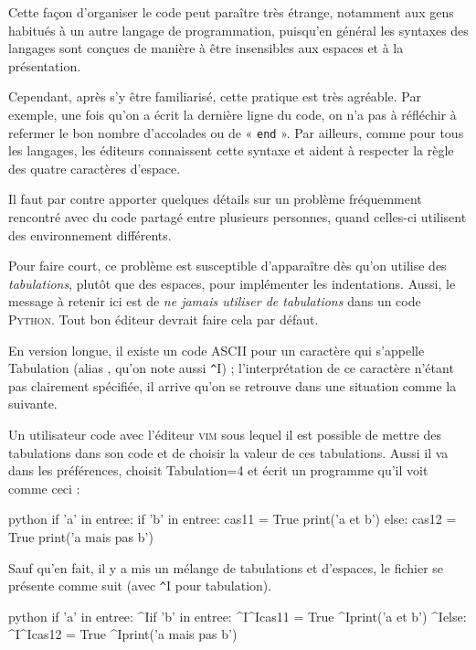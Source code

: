 Cette façon d'organiser le code peut paraître très étrange, notamment aux gens habitués à un autre langage de programmation, puisqu'en général les syntaxes des langages sont conçues de manière à être insensibles aux espaces et à la présentation.

Cependant, après s'y être familiarisé, cette pratique est très agréable. Par exemple, une fois qu'on a écrit la dernière ligne du code, on n'a pas à réfléchir à refermer le bon nombre d'accolades ou de « \texttt{end} ».
Par ailleurs, comme pour tous les langages, les éditeurs connaissent cette syntaxe et aident à respecter la règle des quatre caractères d'espace.

Il faut par contre apporter quelques détails sur un problème fréquemment rencontré avec du code partagé entre plusieurs personnes, quand celles-ci utilisent des environnement différents.

\begin{linewidthnote}
Pour faire court, ce problème est susceptible d'apparaître dès qu'on utilise des \emph{tabulations}, plutôt que des espaces, pour implémenter les indentations. Aussi, le message à retenir ici est de \emph{ne jamais utiliser de tabulations} dans un code \textsc{Python}. Tout bon éditeur devrait faire cela par défaut.
\end{linewidthnote}

En version longue, il existe un code ASCII pour un caractère qui s'appelle Tabulation (alias , qu'on note aussi \lstinline[basicstyle={\small\shellttfont}]{^}I) ; l'interprétation de ce caractère n'étant pas clairement spécifiée, il arrive qu'on se retrouve dans une situation comme la suivante.

Un utilisateur code avec l'éditeur \textsc{vim} sous lequel il est possible de mettre des tabulations dans son code et de choisir la valeur de ces tabulations. Aussi il va dans les préférences, choisit Tabulation=4 et écrit un programme qu'il voit comme ceci :

\begin{codebox}{python}
if 'a' in entree:
    if 'b' in entree:
        cas11 = True
        print('a et b')
    else:
        cas12 = True
        print('a mais pas b')
\end{codebox}

Sauf qu'en fait, il y a mis un mélange de tabulations et d'espaces, le fichier se présente comme suit (avec \lstinline[basicstyle={\small\shellttfont}]{^}I pour tabulation).

\begin{codebox}{python}
if 'a' in entree:
^Iif 'b' in entree:
^I^Icas11 = True
    ^Iprint('a et b')
^Ielse:
^I^Icas12 = True
    ^Iprint('a mais pas b')
\end{codebox}

